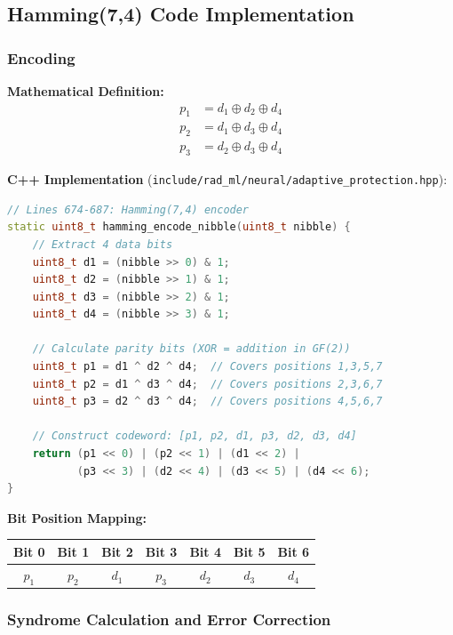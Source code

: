 \documentclass[11pt,a4paper]{article}
\begin{document}
\subsection{Hamming(7,4) Code Implementation}

\subsubsection{Encoding}

\textbf{Mathematical Definition:}
\begin{align}
p_1 &= d_1 \oplus d_2 \oplus d_4 \\
p_2 &= d_1 \oplus d_3 \oplus d_4 \\
p_3 &= d_2 \oplus d_3 \oplus d_4
\end{align}

\textbf{C++ Implementation} (\texttt{include/rad\_ml/neural/adaptive\_protection.hpp}):
\begin{lstlisting}[language=C++, basicstyle=\small\ttfamily]
// Lines 674-687: Hamming(7,4) encoder
static uint8_t hamming_encode_nibble(uint8_t nibble) {
    // Extract 4 data bits
    uint8_t d1 = (nibble >> 0) & 1;
    uint8_t d2 = (nibble >> 1) & 1;
    uint8_t d3 = (nibble >> 2) & 1;
    uint8_t d4 = (nibble >> 3) & 1;

    // Calculate parity bits (XOR = addition in GF(2))
    uint8_t p1 = d1 ^ d2 ^ d4;  // Covers positions 1,3,5,7
    uint8_t p2 = d1 ^ d3 ^ d4;  // Covers positions 2,3,6,7
    uint8_t p3 = d2 ^ d3 ^ d4;  // Covers positions 4,5,6,7

    // Construct codeword: [p1, p2, d1, p3, d2, d3, d4]
    return (p1 << 0) | (p2 << 1) | (d1 << 2) |
           (p3 << 3) | (d2 << 4) | (d3 << 5) | (d4 << 6);
}
\end{lstlisting}

\textbf{Bit Position Mapping:}
\begin{table}[htbp]
\centering
\begin{tabular}{@{}ccccccc@{}}
\toprule
Bit 0 & Bit 1 & Bit 2 & Bit 3 & Bit 4 & Bit 5 & Bit 6 \\
\midrule
$p_1$ & $p_2$ & $d_1$ & $p_3$ & $d_2$ & $d_3$ & $d_4$ \\
\bottomrule
\end{tabular}
\end{table}

\subsubsection{Syndrome Calculation and Error Correction}
\end{document}
